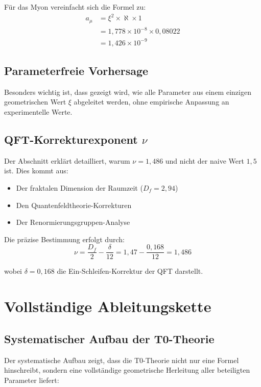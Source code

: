 \documentclass[12pt,a4paper]{article}
\begin{document}
		F\"ur das Myon vereinfacht sich die Formel zu:
		\begin{align}
			a_\mu &= \xi^2 \times \aleph \times 1 \\
			&= 1{,}778 \times 10^{-8} \times 0{,}08022 \\
			&= 1{,}426 \times 10^{-9}
		\end{align}
		
		\subsection{Parameterfreie Vorhersage}
		
		Besonders wichtig ist, dass gezeigt wird, wie alle Parameter aus einem einzigen geometrischen Wert $\xi$ abgeleitet werden, ohne empirische Anpassung an experimentelle Werte.
		
		\subsection{QFT-Korrekturexponent $\nu$}
		
		Der Abschnitt erkl\"art detailliert, warum $\nu = 1{,}486$ und nicht der naive Wert $1{,}5$ ist. Dies kommt aus:
		\begin{itemize}
			\item Der fraktalen Dimension der Raumzeit ($D_f = 2{,}94$)
			\item Den Quantenfeldtheorie-Korrekturen
			\item Der Renormierungsgruppen-Analyse
		\end{itemize}
		
		Die pr\"azise Bestimmung erfolgt durch:
		\begin{equation}
			\nu = \frac{D_f}{2} - \frac{\delta}{12} = 1{,}47 - \frac{0{,}168}{12} = 1{,}486
		\end{equation}
		
		wobei $\delta = 0{,}168$ die Ein-Schleifen-Korrektur der QFT darstellt.

	
	\section{Vollst\"andige Ableitungskette}

		\subsection{Systematischer Aufbau der T0-Theorie}
		
		Der systematische Aufbau zeigt, dass die T0-Theorie nicht nur eine Formel hinschreibt, sondern eine vollst\"andige geometrische Herleitung aller beteiligten Parameter liefert:
		
\end{document}
